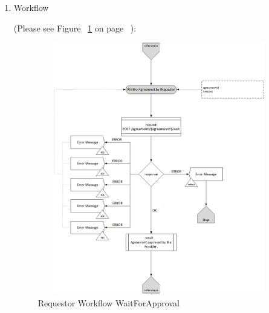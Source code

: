 \begin{enumerate}
\item Workflow

(Please see Figure ~\ref{fig:RWW} on page ~\pageref{fig:RWW}):

\begin{figure}[htbp]
    \centering
    \includegraphics[width=11cm,height=11cm,angle=0]{./diag/Workflow/Market/WaitForAgreement-R-Workflow.png}
    \caption{Requestor Workflow WaitForApproval }
	\label{fig:RWW}
\end{figure}

\end{enumerate}

\newpage



